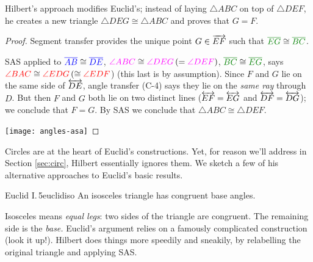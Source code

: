 
Hilbert's approach modifies Euclid's; instead of laying $\triangle ABC$ on top of $\triangle DEF$, he creates a new triangle $\triangle DEG\cong \triangle ABC$ and proves that $G=F$.

\begin{proof}
	Segment transfer provides the unique point $G\in \overrightarrow{EF}$ such that $\textcolor{Green}{\cl{EG}}\cong \textcolor{Green}{\cl{BC}}$.\par
	\begin{minipage}[t]{0.65\linewidth}\vspace{0pt}
		SAS applied to $\textcolor{blue}{\overline{AB}}\cong\textcolor{blue}{\overline{DE}}$, $\textcolor{Magenta}{\angle ABC}\cong\textcolor{Magenta}{\angle DEG}\, (=\textcolor{Magenta}{\angle DEF})$, $\textcolor{Green}{\cl{BC}}\cong \textcolor{Green}{\cl{EG}}$, says $\textcolor{red}{\angle BAC}\cong \textcolor{red}{\angle EDG}\, (\cong \textcolor{red}{\angle EDF}$) (this last is by assumption).\smallbreak
		Since $F$ and $G$ lie on the same side of $\overleftrightarrow{DE}$, angle transfer (C-4) says they lie on the \emph{same ray} through $D$.\smallbreak
		But then $F$ and $G$ both lie on two distinct lines ($\overleftrightarrow{EF}=\overleftrightarrow{EG}$ and $\overleftrightarrow{DF}=\overleftrightarrow{DG}$); we conclude that $F=G$.\smallbreak
		By SAS we conclude that $\triangle ABC\cong\triangle DEF$.
	\end{minipage}
	\hfill
	\begin{minipage}[t]{0.34\linewidth}\vspace{-28pt}
		\flushright
		\texttt{[image: angles-asa]}
	\end{minipage}
\end{proof}





Circles are at the heart of Euclid's constructions. Yet, for reason we'll address in Section \ref{sec:circ}, Hilbert essentially ignores them. We sketch a few of his alternative approaches to Euclid's basic results.

\begin{thm}{Euclid I.\,5}{euclidiso}
	An isosceles triangle has congruent base angles.
\end{thm}

Isosceles means \emph{equal legs}: two sides of the triangle are congruent. The remaining side is the \emph{base.} Euclid's argument relies on a famously complicated construction (look it up!). Hilbert does things more speedily and sneakily, by relabelling the original triangle and applying SAS.

